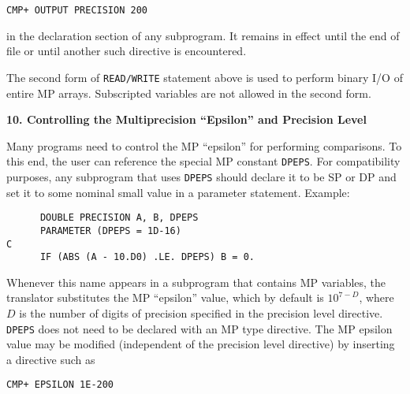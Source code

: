 \begin{tt} \begin{small} \begin{verbatim}
CMP+ OUTPUT PRECISION 200
\end{verbatim} \end{small} \end{tt}
 
\noindent
in the declaration section of any subprogram.  It remains in effect
until the end of file or until another such directive is encountered.
 
The second form of {\tt READ/WRITE} statement above is used to perform
binary I/O of entire MP arrays.  Subscripted variables are not allowed
in the second form.
 
\vspace{2ex} \noindent
{\bf 10. Controlling the Multiprecision ``Epsilon'' and Precision
Level}
 
Many programs need to control the MP ``epsilon'' for performing
comparisons.  To this end, the user can reference the special MP
constant {\tt DPEPS}.  For compatibility purposes, any subprogram that
uses {\tt DPEPS} should declare it to be SP or DP and set it to some
nominal small value in a parameter statement.  Example:

\begin{tt} \begin{small} \begin{verbatim} 
      DOUBLE PRECISION A, B, DPEPS
      PARAMETER (DPEPS = 1D-16)
C
      IF (ABS (A - 10.D0) .LE. DPEPS) B = 0.
\end{verbatim} \end{small} \end{tt}
 
\noindent
Whenever this name appears in a subprogram that contains MP variables,
the translator substitutes the MP ``epsilon'' value, which by default
is $10 ^ {7 - D}$, where $D$ is the number of digits of precision
specified in the precision level directive.  {\tt DPEPS} does not need
to be declared with an MP type directive.  The MP epsilon value may be
modified (independent of the precision level directive) by inserting a
directive such as
 
\begin{tt} \begin{small} \begin{verbatim}
CMP+ EPSILON 1E-200
\end{verbatim} \end{small} \end{tt}
 
